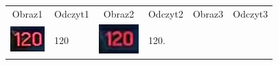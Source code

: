 \begin{table}[h!]
  \centering
  \begin{tabular}{c l c l c l}
    Obraz1 & Odczyt1 & Obraz2 & Odczyt2 & Obraz3 & Odczyt3  \\ 
    \begin{minipage}{.2\textwidth}
      \includegraphics[width=\textwidth]{img/exp_number_02}
    \end{minipage}
    &
    120
    &
    \begin{minipage}{.2\textwidth}
      \includegraphics[width=\textwidth]{img/exp_number_03}
    \end{minipage}
    &
    120.
    &
    \begin{minipage}{.2\textwidth}

\end{minipage}
\end{tabular}
\end{table}

